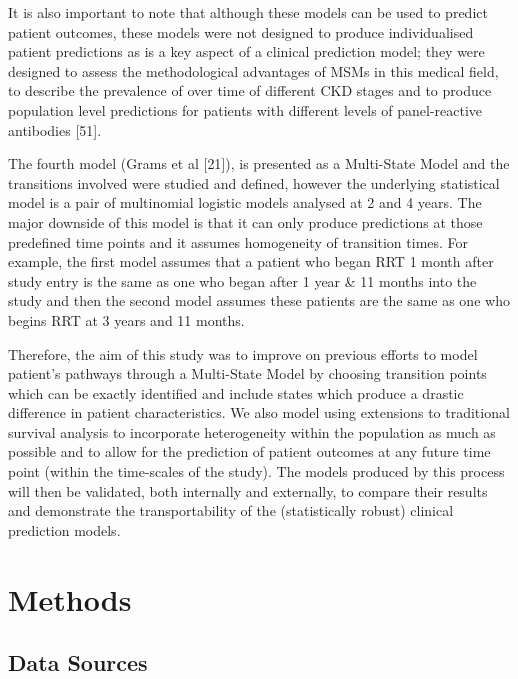 \documentclass[12pt,twoside]{reedthesis}
\begin{document}
It is also important to note that although these models can be used to predict patient outcomes, these models were not designed to produce individualised patient predictions as is a key aspect of a clinical prediction model; they were designed to assess the methodological advantages of MSMs in this medical field, to describe the prevalence of over time of different CKD stages and to produce population level predictions for patients with different levels of panel-reactive antibodies {[}51{]}.

The fourth model (Grams et al {[}21{]}), is presented as a Multi-State Model and the transitions involved were studied and defined, however the underlying statistical model is a pair of multinomial logistic models analysed at 2 and 4 years. The major downside of this model is that it can only produce predictions at those predefined time points and it assumes homogeneity of transition times. For example, the first model assumes that a patient who began RRT 1 month after study entry is the same as one who began after 1 year \& 11 months into the study and then the second model assumes these patients are the same as one who begins RRT at 3 years and 11 months.

Therefore, the aim of this study was to improve on previous efforts to model patient's pathways through a Multi-State Model by choosing transition points which can be exactly identified and include states which produce a drastic difference in patient characteristics. We also model using extensions to traditional survival analysis to incorporate heterogeneity within the population as much as possible and to allow for the prediction of patient outcomes at any future time point (within the time-scales of the study). The models produced by this process will then be validated, both internally and externally, to compare their results and demonstrate the transportability of the (statistically robust) clinical prediction models.

\hypertarget{methods-4}{%
\section{Methods}\label{methods-4}}

\hypertarget{data-sources}{%
\subsection{Data Sources}\label{data-sources}}
\end{document}
